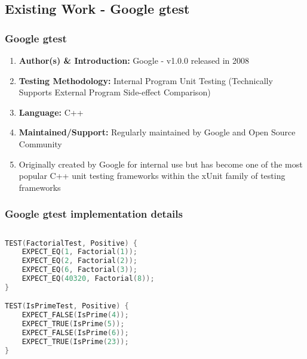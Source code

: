 \documentclass[xcolor]{beamer}
\begin{document}
\subsection{Existing Work - Google gtest}
\begin{frame}
	\frametitle{Google gtest}
	\begin{enumerate}
		\setlength\itemsep{1em}
		\item \textbf{Author(s) \& Introduction:} Google - v1.0.0 released in 2008
			\pause
		\item \textbf{Testing Methodology:} Internal Program Unit Testing (Technically Supports External Program Side-effect Comparison)
			\pause
		\item \textbf{Language:} C++
			\pause
		\item \textbf{Maintained/Support:} Regularly maintained by Google and Open Source Community
			\pause 
		\item Originally created by Google for internal use but has become one of the most popular C++ unit testing frameworks within the xUnit family of testing frameworks
	\end{enumerate}
\end{frame}
\begin{frame}[fragile]
	\frametitle{Google gtest implementation details}
	\begin{columns}
		\begin{column}{0.45\textwidth}
			\centering
\begin{lstlisting}[language=c, breaklines=true, caption={gtest test cases}]
TEST(FactorialTest, Positive) {
    EXPECT_EQ(1, Factorial(1));
    EXPECT_EQ(2, Factorial(2));
    EXPECT_EQ(6, Factorial(3));
    EXPECT_EQ(40320, Factorial(8));
}

TEST(IsPrimeTest, Positive) {
    EXPECT_FALSE(IsPrime(4));
    EXPECT_TRUE(IsPrime(5));
    EXPECT_FALSE(IsPrime(6));
    EXPECT_TRUE(IsPrime(23));
}
\end{lstlisting}
		\end{column}
		\begin{column}{0.45\textwidth}
			\centering
		\end{column}
	\end{columns}
\end{frame}
\end{document}
